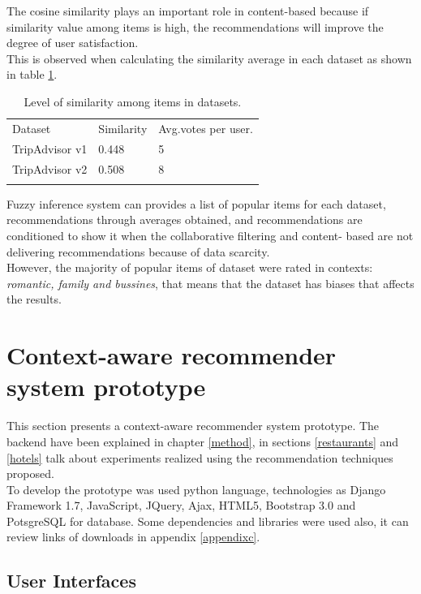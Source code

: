 The cosine similarity plays an important role in content-based because
if similarity value among items is high, the recommendations will
improve the degree of user satisfaction. \\ This is observed when
calculating the similarity average in each dataset as shown in table
\ref{tab:5}.
\begin{table}
\centering
\small
\captionsetup{font=footnotesize}
\caption{Level of similarity among items in datasets. }
\label{tab:5}      
\begin{tabular}{lll}
\hline\noalign{\smallskip}
Dataset  & Similarity  & Avg.votes per user. \\
\noalign{\smallskip}\hline\noalign{\smallskip}
TripAdvisor v1 & 0.448  & 5  \\
TripAdvisor v2 & 0.508  & 8  \\
\noalign{\smallskip}\hline
\end{tabular}
\end{table}
Fuzzy inference system can provides a list of popular items for each dataset,
recommendations through averages obtained, and recommendations are
conditioned to show it when the collaborative filtering and content-
based are not delivering recommendations because of data scarcity.\\ 
However, the majority of popular items of dataset were rated in contexts: 
\textit{romantic, family and bussines}, that means that the dataset has
biases that affects the results.


\section{Context-aware recommender system prototype} 

This section presents a context-aware recommender system prototype.
The backend have been explained in chapter \ref{method},  in sections
\ref{restaurants} and \ref{hotels} talk about experiments realized
using the recommendation techniques proposed. \\ To develop the prototype
was used python language, technologies as Django Framework 1.7,
JavaScript, JQuery, Ajax, HTML5, Bootstrap 3.0  and PotsgreSQL for database.
Some dependencies and libraries were used also, it can review links of
downloads in appendix \ref{appendixc}.

\subsection{User Interfaces}

